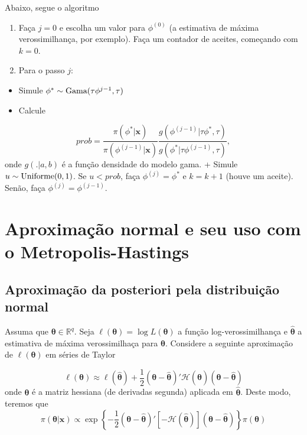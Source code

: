 \documentclass[
  letterpaper,
  DIV=11,
  numbers=noendperiod]{scrreprt}
\providecommand{\tightlist}{%
  \setlength{\itemsep}{0pt}\setlength{\parskip}{0pt}}\usepackage{longtable,booktabs,array}
\theoremstyle{definition}
\theoremstyle{definition}
\theoremstyle{plain}
\theoremstyle{remark}
\begin{document}
Abaixo, segue o algoritmo

\begin{enumerate}
\def\labelenumi{\arabic{enumi}.}
\item
  Faça \(j=0\) e escolha um valor para \(\phi^{(0)}\) (a estimativa de
  máxima verossimilhança, por exemplo). Faça um contador de aceites,
  começando com \(k=0\).
\item
  Para o passo \(j\):
\end{enumerate}

\begin{itemize}
\tightlist
\item
  Simule \(\phi^*\sim\hbox{Gama}(\tau\phi^{j-1},\tau)\)
\item
  Calcule
\end{itemize}

\[prob = \frac{\pi(\phi^*|\boldsymbol{x})}{\pi(\phi^{(j-1)}|\boldsymbol{x})}\frac{g(\phi^{(j-1)}|\tau\phi^*,\tau)}{g(\phi^*|\tau\phi^{(j-1)},\tau)},\]
onde \(g(.|a,b)\) é a função densidade do modelo gama. + Simule
\(u\sim\hbox{Uniforme}(0,1)\). Se \(u<prob\), faça \(\phi^{(j)}=\phi^*\)
e \(k=k+1\) (houve um aceite). Senão, faça \(\phi^{(j)}=\phi^{(j-1)}\).


\chapter{Aproximação normal e seu uso com o
Metropolis-Hastings}\label{aproximauxe7uxe3o-normal-e-seu-uso-com-o-metropolis-hastings}

\section{Aproximação da posteriori pela distribuição
normal}\label{aproximauxe7uxe3o-da-posteriori-pela-distribuiuxe7uxe3o-normal}

Assuma que \(\boldsymbol{\theta}\in\mathbb{R}^q\). Seja
\(\ell(\boldsymbol{\theta})=\log L(\boldsymbol{\theta})\) a função
log-verossimilhança e \(\hat{\boldsymbol{\theta}}\) a estimativa de
máxima verossimilhaça para \(\boldsymbol{\theta}\). Considere a seguinte
aproximação de \(\ell(\boldsymbol{\theta})\) em séries de Taylor

\[\ell(\boldsymbol{\theta})\approx  \ell(\hat{\boldsymbol{\theta}})+\frac{1}{2}(\boldsymbol{\theta}-\hat{\boldsymbol{\theta}})'\mathcal{H}(\hat{\boldsymbol{\theta}})(\boldsymbol{\theta}-\hat{\boldsymbol{\theta}})\]
onde \(\boldsymbol{\theta}\) é a matriz hessiana (de derivadas segunda)
aplicada em \(\hat{\boldsymbol{\theta}}\). Deste modo, teremos que
\[\pi(\boldsymbol{\theta}|\boldsymbol{x})\propto \exp\left\{-\frac{1}{2}(\boldsymbol{\theta}-\hat{\boldsymbol{\theta}})'\left[-\mathcal{H}(\hat{\boldsymbol{\theta}})\right](\boldsymbol{\theta}-\hat{\boldsymbol{\theta}})\right\}\pi(\boldsymbol{\theta})\]
\end{document}
